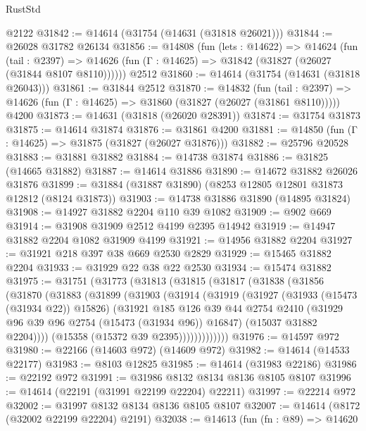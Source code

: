 \begin{lexlean}{RustStd}
\begin{coremodule}
    @2122
@31842 := @14614 (@31754 (@14631 (@31818 @26021)))
@31844 := @26028 @31782 @26134
@31856 := @14808
    (fun (lets : @14622) =>
    @14624
      (fun (tail : @2397) =>
      @14626 (fun (Γ : @14625) => @31842 (@31827 (@26027 (@31844 @8107 @8110))))))
    @2512
@31860 := @14614 (@31754 (@14631 (@31818 @26043)))
@31861 := @31844 @2512
@31870 := @14832
    (fun (tail : @2397) => @14626 (fun (Γ : @14625) => @31860 (@31827 (@26027 (@31861 @8110)))))
    @4200
@31873 := @14631 (@31818 (@26020 @28391))
@31874 := @31754 @31873
@31875 := @14614 @31874
@31876 := @31861 @4200
@31881 := @14850 (fun (Γ : @14625) => @31875 (@31827 (@26027 @31876)))
@31882 := @25796 @20528
@31883 := @31881 @31882
@31884 := @14738 @31874
@31886 := @31825 (@14665 @31882)
@31887 := @14614 @31886
@31890 := @14672 @31882 @26026 @31876
@31899 := @31884 (@31887 @31890) (@8253 @12805 @12801 @31873 @12812 (@8124 @31873))
@31903 := @14738 @31886 @31890 (@14895 @31824)
@31908 := @14927 @31882 @2204 @110 @39 @1082
@31909 := @902 @669
@31914 := @31908 @31909 @2512 @4199 @2395 @14942
@31919 := @14947 @31882 @2204 @1082 @31909 @4199
@31921 := @14956 @31882 @2204
@31927 := @31921 @218 @397 @38 @669 @2530 @2829
@31929 := @15465 @31882 @2204
@31933 := @31929 @22 @38 @22 @2530
@31934 := @15474 @31882
@31975 := @31751
    (@31773
      (@31813
        (@31815
          (@31817
            (@31838
              (@31856
                (@31870
                  (@31883
                    (@31899
                      (@31903
                        (@31914
                          (@31919
                            (@31927
                              (@31933 (@15473 (@31934 @22)) @15826)
                              (@31921
                                @185
                                @126
                                @39
                                @44
                                @2754
                                @2410
                                (@31929 @96 @39 @96 @2754 (@15473 (@31934 @96)) @16847)
                                (@15037 @31882 @2204))))
                          (@15358 (@15372 @39 @2395)))))))))))))
@31976 := @14597 @972
@31980 := @22166 (@14603 @972) (@14609 @972)
@31982 := @14614 (@14533 @22177)
@31983 := @8103 @12825
@31985 := @14614 (@31983 @22186)
@31986 := @22192 @972
@31991 := @31986 @8132 @8134 @8136 @8105 @8107
@31996 := @14614 (@22191 (@31991 @22199 @22204) @22211)
@31997 := @22214 @972
@32002 := @31997 @8132 @8134 @8136 @8105 @8107
@32007 := @14614 (@8172 (@32002 @22199 @22204) @2191)
@32038 := @14613
    (fun (fn : @89) =>
    @14620

\end{coremodule}
\end{lexlean}
